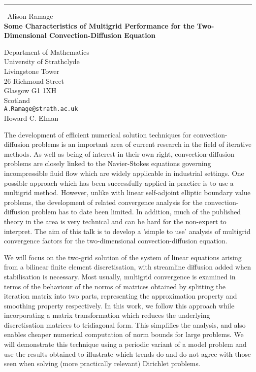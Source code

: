 \documentclass{report}
\begin{document}
\begin{center}
\rule{6in}{1pt} \
{\large Alison Ramage \\
{\bf Some Characteristics of Multigrid Performance for the Two-Dimensional Convection-Diffusion Equation}}

Department of Mathematics \\ University of Strathclyde \\ Livingstone Tower \\ 26 Richmond Street \\ Glasgow G1 1XH \\ Scotland
\\
{\tt A.Ramage@strath.ac.uk}\\
Howard C. Elman\end{center}

The development of efficient numerical solution techniques for
convection-diffusion problems is an important area of current research in
the field of iterative methods. As well as being of interest in their own
right, convection-diffusion problems are closely linked to the
Navier-Stokes equations governing incompressible fluid flow which are
widely applicable in industrial settings. One possible approach which has
been successfully applied in practice is to use a multigrid method.
However, unlike with
linear self-adjoint elliptic boundary value problems, the development of
related convergence analysis for the convection-diffusion problem has to
date been limited. In addition, much of the published theory in the area
is very technical and can be hard for the non-expert to interpret. The
aim of this talk is to develop a 'simple to use' analysis of multigrid
convergence factors
for the two-dimensional convection-diffusion equation.

We will focus on the two-grid solution of the system of linear equations
arising from a bilinear finite element discretisation,
with streamline diffusion added when stabilisation is necessary. Most
usually, multigrid convergence is examined in terms of the behaviour of
the norms of matrices obtained by splitting the iteration matrix into two
parts, representing the approximation property and smoothing property
respectively. In this work, we follow this approach while incorporating a
matrix transformation which reduces the underlying discretisation
matrices to tridiagonal form. This simplifies the analysis, and also
enables cheaper numerical computation of norm bounds for large problems.
We will demonstrate this technique using a periodic variant of a model
problem and use the results obtained to illustrate which trends do and do
not agree with those seen when solving (more practically relevant)
Dirichlet problems.
\end{document}
